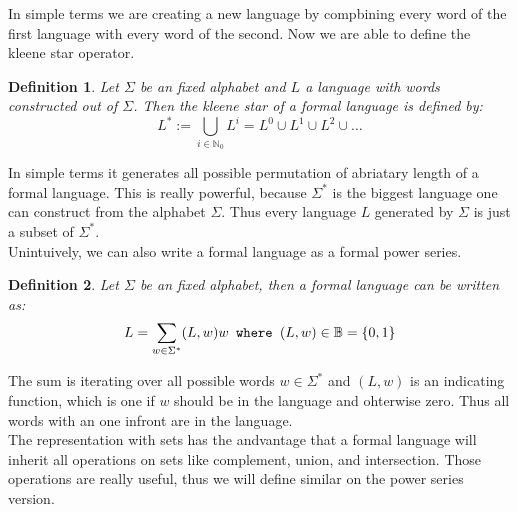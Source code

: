 \documentclass[12pt,letterpaper]{article}
\newtheorem{definition}{Definition}
\begin{document}
In simple terms we are creating a new language by compbining every word
of the first language with every word of the second.
Now we are able to define the kleene star operator.
\begin{definition}
  Let $\Sigma$ be an fixed alphabet and  $L$  a language with 
  words constructed out of $\Sigma$.
  Then the kleene star of  a formal language is defined by:
  \[ 
    L^* := \bigcup_{i \in \mathbb{N}_0} L^i = 
    L^0 \cup L^1 \cup L^2 \cup \dots
  \]
\end{definition}
In simple terms it generates all possible permutation of abriatary length
of a formal language. This is really powerful, because $\Sigma^*$ is the
biggest language one can construct from the alphabet $\Sigma$. Thus every 
language $L$ generated by $\Sigma$ is just a subset of $\Sigma^*$.\\
Unintuively, we can also write a formal language as a formal power series.
\begin{definition}
  Let $\Sigma$ be an fixed alphabet, then a formal language can be 
  written as:
  \[
    L = \sum_{w \in \Sigma^*} (L,w)w \verb| where | 
    (L,w) \in \mathbb{B} = \{0,1\}
  \]
\end{definition}
The sum is iterating over all possible words $w \in \Sigma^*$ and 
$(L,w)$ is an indicating function, which is one if $w$ should be in the
language and ohterwise zero. Thus all words with an one infront are in 
the language.\\
The representation with sets has the andvantage that a formal language
will inherit all operations on sets like complement, union, and intersection.
Those operations are really useful, thus we will define similar on the power
series version.
\end{document}
